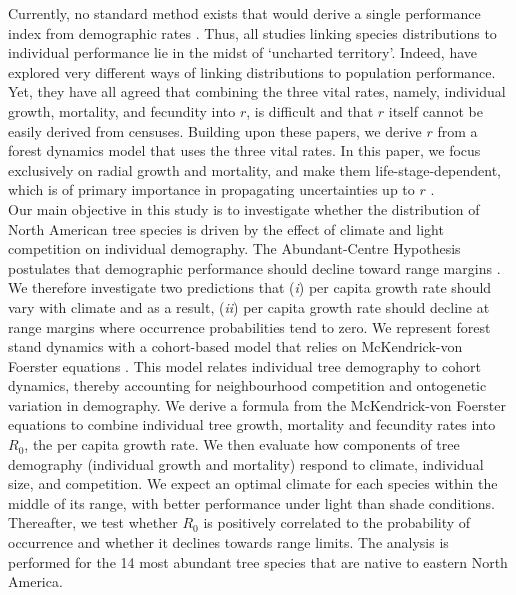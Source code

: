 Currently, no standard method exists that would derive a single performance index from demographic rates \citep{Purves2009}. Thus, all studies linking species distributions to individual performance lie in the midst of `uncharted territory'. Indeed, \cite{McGill2012, Thuiller2014, Pagel2012} have explored very different ways of linking distributions to population performance. Yet, they have all agreed that combining the three vital rates, namely, individual growth, mortality, and fecundity into $ r $, is difficult and that $ r $ itself cannot be easily derived from censuses. Building upon these papers, we derive $ r $ from a forest dynamics model that uses the three vital rates. In this paper, we focus exclusively on radial growth and mortality, and make them life-stage-dependent, which is of primary importance in propagating uncertainties up to $ r $ \citep[$ \lambda $ in his article]{Clark2003b}. \\

Our main objective in this study is to investigate whether the distribution of North American tree species is driven by the effect of climate and light competition on individual demography. The Abundant-Centre Hypothesis postulates that demographic performance should decline toward range margins \citep{Sagarin2002}. We therefore investigate two predictions that (\textit{i}) per capita growth rate should vary with climate and as a result, (\textit{ii}) per capita growth rate should decline at range margins where occurrence probabilities tend to zero. We represent forest stand dynamics with a cohort-based model that relies on McKendrick-von Foerster equations \citep{Strigul2008}. This model relates individual tree demography to cohort dynamics, thereby accounting for neighbourhood competition and ontogenetic variation in demography. We derive a formula from the McKendrick-von Foerster equations to combine individual tree growth, mortality and fecundity rates into $ R_0 $, \ie the per capita growth rate. We then evaluate how components of tree demography (individual growth and mortality) respond to climate, individual size, and competition. We expect an optimal climate for each species within the middle of its range, with better performance under light than shade conditions. Thereafter, we test whether $ R_0 $ is positively correlated to the probability of occurrence and whether it declines towards range limits. The analysis is performed for the 14 most abundant tree species that are native to eastern North America.
